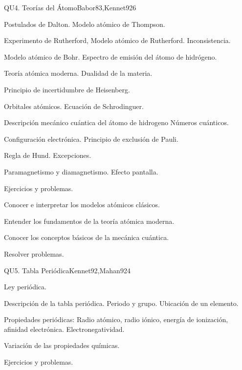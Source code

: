 \begin{syllabus}
\begin{unit}{QU4. Teorías del Átomo}{Babor83,Kennet92}{6}
\begin{topics}
      \item Postulados de Dalton. Modelo atómico de Thompson.
      \item Experimento de Rutherford, Modelo atómico de Rutherford. Inconsistencia.
      \item Modelo atómico de Bohr. Espectro de emisión del átomo de hidrógeno.
      \item Teoría atómica moderna. Dualidad de la materia.
      \item Principio de incertidumbre de Heisenberg.
      \item Orbitales atómicos. Ecuación de Schrodinguer.
      \item Descripción mecánico cuántica del átomo de hidrogeno Números cuánticos.
      \item Configuración electrónica. Principio de exclusión de Pauli.
      \item Regla de Hund. Excepciones.
      \item Paramagnetismo y diamagnetismo. Efecto pantalla.
      \item Ejercicios y problemas.
   \end{topics}

   \begin{learningoutcomes}
      \item Conocer e interpretar los modelos atómicos clásicos.
      \item Entender los fundamentos de la teoría atómica moderna.
      \item Conocer los conceptos básicos de la mecánica cuántica.
      \item Resolver problemas.
   \end{learningoutcomes}
\end{unit}

\begin{unit}{QU5. Tabla Periódica}{Kennet92,Mahan92}{4}
\begin{topics}
	\item Ley periódica.
	\item Descripción de la tabla periódica. Periodo y grupo. Ubicación de un elemento.
	\item Propiedades periódicas: Radio atómico, radio iónico, energía de ionización, afinidad electrónica. Electronegatividad.
	\item Variación de las propiedades químicas.
	\item Ejercicios y problemas.
   \end{topics}


\end{unit}
\end{syllabus}
